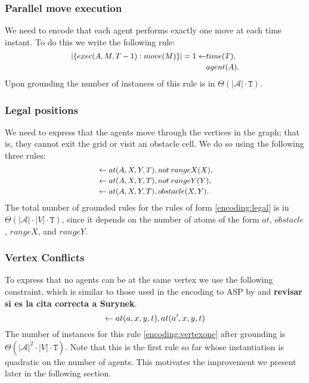 \subsubsection{Parallel move execution}
We need to encode that each agent performs exactly one move at each time instant. To do this we write the following rule:
\begin{equation}\small\label{encoding:delta}
\begin{split}
|\{exec(A,M,T-1) : move(M) \}| = 1 \leftarrow &time(T),\\&agent(A).
\end{split}
\end{equation}
Upon grounding the number of instances of this rule is in $\Theta(|\mathcal{A}|\cdot \mathtt{T})$.
\subsubsection{Legal positions}
We need to express that the agents move through the vertices in the graph; that is, they cannot exit the grid or visit an obstacle cell. We do so using the following three rules:
\begin{equation}\label{encoding:legal}\small
    \begin{split}
&\leftarrow at(A,X,Y,T), not\: rangeX(X),\\
&\leftarrow at(A,X,Y,T), not\: rangeY(Y),\\
&\leftarrow at(A,X,Y,T), obstacle(X,Y). %
    \end{split}
\end{equation}
The total number of grounded rules for the rules of form \eqref{encoding:legal} is in $\Theta(|\mathcal{A}| \cdot |V| \cdot \mathtt{T})$, since it depends on the number of atoms of the form $at$, $obstacle$, $rangeX$, and $rangeY$.

\subsubsection{Vertex Conflicts}
To express that no agents can be at the same vertex we use the following constraint, which is similar to those used in the encoding to ASP by  and  \textbf{revisar si es la cita correcta a Surynek}.
\begin{equation}\small\label{encoding:vertexone}
    \leftarrow at(a,x,y,t), at(a',x,y,t)
\end{equation}
The number of instances for this rule \eqref{encoding:vertexone} after grounding is $\Theta(|\mathcal{A}|^2 \cdot |V| \cdot \mathtt{T})$. Note that this is the first rule so far whose instantiation is quadratic on the number of agents. This motivates the improvement we present later in the following section.
